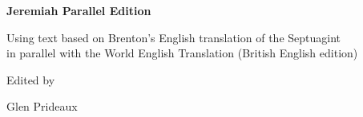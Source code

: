 \begin{titlepage}
\thispagestyle{empty}

\vspace*{\fill}

\begin{center}

{\Huge\bfseries Jeremiah Parallel Edition\par}

\vspace{1.5em}

{\Large
Using text based on Brenton's English translation of the Septuagint\\
in parallel with the World English Translation (British English edition)\par}

\vspace{3em}

{\large Edited by\par}

\vspace{0.5em}

{\Large Glen Prideaux\par}

\end{center}

\vspace*{\fill}

\end{titlepage}